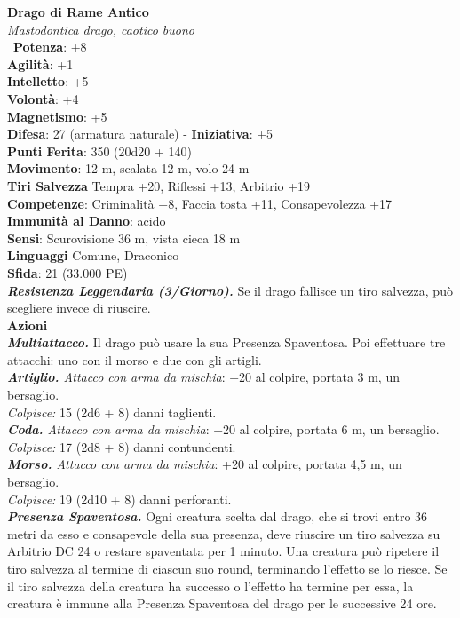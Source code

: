 \begin{multicols}{2}
\medskip\textbf{Drago di Rame Antico}\\
\emph{Mastodontica drago, caotico buono}\\\
\textbf{Potenza}: +8\\
\textbf{Agilità}: +1\\
\textbf{Intelletto}: +5\\
\textbf{Volontà}: +4\\
\textbf{Magnetismo}: +5\\
\textbf{Difesa}: 27 (armatura naturale) - \textbf{Iniziativa}: +5\\
\textbf{Punti Ferita}: 350 (20d20 + 140)\\
\textbf{Movimento}: 12 m, scalata 12 m, volo 24 m\\
\textbf{Tiri Salvezza} Tempra +20, Riflessi +13, Arbitrio +19\\
\textbf{Competenze}: Criminalità +8, Faccia tosta +11, Consapevolezza +17\\
\textbf{Immunità al Danno}: acido\\
\textbf{Sensi}: Scurovisione 36 m, vista cieca 18 m\\
\textbf{Linguaggi} Comune, Draconico\\
\textbf{Sfida}: 21 (33.000 PE)\smallskip\\
\emph{\textbf{Resistenza Leggendaria (3/Giorno).}} Se il drago fallisce un tiro salvezza, può scegliere invece di riuscire.\\
\smallskip\textbf{Azioni}\\
\emph{\textbf{Multiattacco.}} Il drago può usare la sua Presenza Spaventosa. Poi effettuare tre attacchi: uno con il morso e due con gli artigli.\\
\emph{\textbf{Artiglio.} Attacco con arma da mischia}: +20 al colpire, portata 3 m, un bersaglio.\\
\emph{Colpisce:} 15 (2d6 + 8) danni taglienti.\\
\emph{\textbf{Coda.} Attacco con arma da mischia}: +20 al colpire, portata 6 m, un bersaglio.\\
\emph{Colpisce:} 17 (2d8 + 8) danni contundenti.\\
\emph{\textbf{Morso.} Attacco con arma da mischia}: +20 al colpire, portata 4,5 m, un bersaglio.\\
\emph{Colpisce:} 19 (2d10 + 8) danni perforanti.\\
\emph{\textbf{Presenza Spaventosa.}} Ogni creatura scelta dal drago, che si trovi entro 36 metri da esso e consapevole della sua presenza, deve riuscire un tiro salvezza su Arbitrio DC  24 o restare spaventata per 1 minuto. Una creatura può ripetere il tiro salvezza al termine di ciascun suo round, terminando l'effetto se lo riesce. Se il tiro salvezza della creatura ha successo o l'effetto ha termine per essa, la creatura è immune alla Presenza Spaventosa del drago per le successive 24 ore.\\

\end{multicols}
